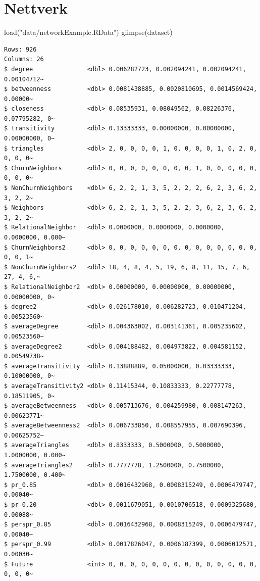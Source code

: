 \documentclass[
  letterpaper,
  DIV=11,
  numbers=noendperiod]{scrreprt}
\newenvironment{Shaded}{\begin{snugshade}}{\end{snugshade}}
\newcommand{\FunctionTok}[1]{\textcolor[rgb]{0.28,0.35,0.67}{#1}}
\newcommand{\NormalTok}[1]{\textcolor[rgb]{0.00,0.23,0.31}{#1}}
\newcommand{\StringTok}[1]{\textcolor[rgb]{0.13,0.47,0.30}{#1}}
\theoremstyle{definition}
\theoremstyle{remark}
\begin{document}
\hypertarget{nettverk}{%
\section{Nettverk}\label{nettverk}}

\begin{Shaded}
\begin{Highlighting}[]
\FunctionTok{load}\NormalTok{(}\StringTok{"data/networkExample.RData"}\NormalTok{)}
\FunctionTok{glimpse}\NormalTok{(dataset)}
\end{Highlighting}
\end{Shaded}

\begin{verbatim}
Rows: 926
Columns: 26
$ degree               <dbl> 0.006282723, 0.002094241, 0.002094241, 0.00104712~
$ betweenness          <dbl> 0.0081438885, 0.0020810695, 0.0014569424, 0.00000~
$ closeness            <dbl> 0.08535931, 0.08049562, 0.08226376, 0.07795282, 0~
$ transitivity         <dbl> 0.13333333, 0.00000000, 0.00000000, 0.00000000, 0~
$ triangles            <dbl> 2, 0, 0, 0, 0, 1, 0, 0, 0, 0, 1, 0, 2, 0, 0, 0, 0~
$ ChurnNeighbors       <dbl> 0, 0, 0, 0, 0, 0, 0, 0, 1, 0, 0, 0, 0, 0, 0, 0, 0~
$ NonChurnNeighbors    <dbl> 6, 2, 2, 1, 3, 5, 2, 2, 2, 6, 2, 3, 6, 2, 3, 2, 2~
$ Neighbors            <dbl> 6, 2, 2, 1, 3, 5, 2, 2, 3, 6, 2, 3, 6, 2, 3, 2, 2~
$ RelationalNeighbor   <dbl> 0.0000000, 0.0000000, 0.0000000, 0.0000000, 0.000~
$ ChurnNeighbors2      <dbl> 0, 0, 0, 0, 0, 0, 0, 0, 0, 0, 0, 0, 0, 0, 0, 0, 1~
$ NonChurnNeighbors2   <dbl> 18, 4, 8, 4, 5, 19, 6, 8, 11, 15, 7, 6, 27, 4, 6,~
$ RelationalNeighbor2  <dbl> 0.00000000, 0.00000000, 0.00000000, 0.00000000, 0~
$ degree2              <dbl> 0.026178010, 0.006282723, 0.010471204, 0.00523560~
$ averageDegree        <dbl> 0.004363002, 0.003141361, 0.005235602, 0.00523560~
$ averageDegree2       <dbl> 0.004188482, 0.004973822, 0.004581152, 0.00549738~
$ averageTransitivity  <dbl> 0.13888889, 0.05000000, 0.03333333, 0.10000000, 0~
$ averageTransitivity2 <dbl> 0.11415344, 0.10833333, 0.22777778, 0.18511905, 0~
$ averageBetweenness   <dbl> 0.005713676, 0.004259980, 0.008147263, 0.00623771~
$ averageBetweenness2  <dbl> 0.006733850, 0.008557955, 0.007690396, 0.00625752~
$ averageTriangles     <dbl> 0.8333333, 0.5000000, 0.5000000, 1.0000000, 0.000~
$ averageTriangles2    <dbl> 0.7777778, 1.2500000, 0.7500000, 1.7500000, 0.400~
$ pr_0.85              <dbl> 0.0016432968, 0.0008315249, 0.0006479747, 0.00040~
$ pr_0.20              <dbl> 0.0011679051, 0.0010706518, 0.0009325680, 0.00088~
$ perspr_0.85          <dbl> 0.0016432968, 0.0008315249, 0.0006479747, 0.00040~
$ perspr_0.99          <dbl> 0.0017826047, 0.0006187399, 0.0006012571, 0.00030~
$ Future               <int> 0, 0, 0, 0, 0, 0, 0, 0, 0, 0, 0, 0, 0, 0, 0, 0, 0~
\end{verbatim}
\end{document}
